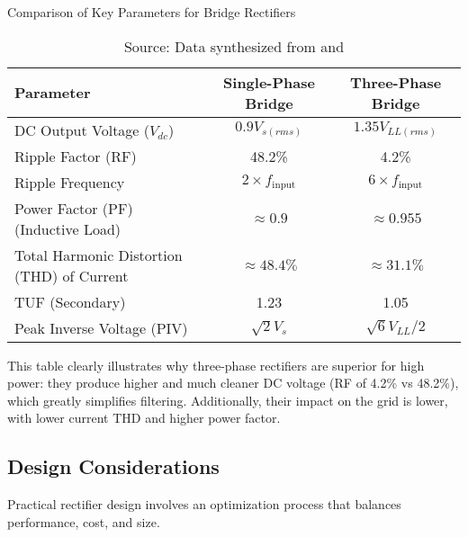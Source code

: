 \documentclass[12pt,a4paper]{article}
\begin{document}
\begin{table}[H]
\centering
\caption{Comparison of Key Parameters for Bridge Rectifiers}
\label{tab:rectifiers}
\begin{tabular}{lcc}
\toprule
\textbf{Parameter} & \textbf{Single-Phase Bridge} & \textbf{Three-Phase Bridge} \\
\midrule
DC Output Voltage ($V_{dc}$) & $0.9 V_{s(rms)}$ & $1.35 V_{LL(rms)}$ \\
Ripple Factor (RF) & 48.2\% & 4.2\% \\
Ripple Frequency & $2 \times f_{\text{input}}$ & $6 \times f_{\text{input}}$ \\
Power Factor (PF) (Inductive Load) & $\approx 0.9$ & $\approx 0.955$ \\
Total Harmonic Distortion (THD) of Current & $\approx 48.4\%$ & $\approx 31.1\%$ \\
TUF (Secondary) & 1.23 & 1.05 \\
Peak Inverse Voltage (PIV) & $\sqrt{2}V_s$ & $\sqrt{6}V_{LL}/2$ \\
\bottomrule
\end{tabular}
\caption*{Source: Data synthesized from \cite{rashid2014} and \cite{mohan2003}}
\end{table}

This table clearly illustrates why three-phase rectifiers are superior for high power: they produce higher and much cleaner DC voltage (RF of 4.2\% vs 48.2\%), which greatly simplifies filtering. Additionally, their impact on the grid is lower, with lower current THD and higher power factor.

\subsection{Design Considerations}

Practical rectifier design involves an optimization process that balances performance, cost, and size.
\end{document}
